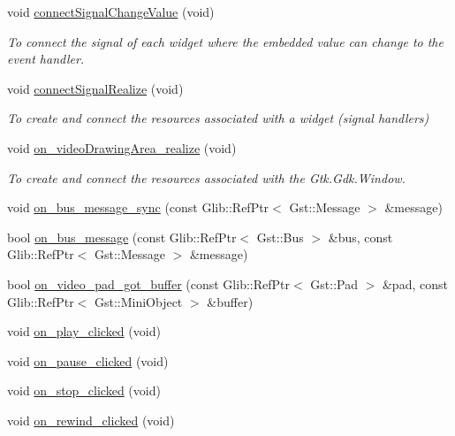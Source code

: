 \begin{DoxyCompactItemize}
void \hyperlink{classplayerWindow_a57c7d3028404d831bbecca99ecd2e6bf}{connect\-Signal\-Change\-Value} (void)
\begin{DoxyCompactList}\small\item\em To connect the signal of each widget where the embedded value can change to the event handler. \end{DoxyCompactList}\item 
void \hyperlink{classplayerWindow_a04c0d0ccc64d561bf455c45f0bf37027}{connect\-Signal\-Realize} (void)
\begin{DoxyCompactList}\small\item\em To create and connect the resources associated with a widget (signal handlers) \end{DoxyCompactList}\item 
void \hyperlink{classplayerWindow_a48b491c8e59ea9c0ef83e7579c0f8f39}{on\-\_\-video\-Drawing\-Area\-\_\-realize} (void)
\begin{DoxyCompactList}\small\item\em To create and connect the resources associated with the Gtk.\-Gdk.\-Window. \end{DoxyCompactList}\item 
void \hyperlink{classplayerWindow_adcb6e98728d16b3141b3eb5ddb8812e7}{on\-\_\-bus\-\_\-message\-\_\-sync} (const Glib\-::\-Ref\-Ptr$<$ Gst\-::\-Message $>$ \&message)
\item 
bool \hyperlink{classplayerWindow_acb2958d0b281f95d53e9887681672700}{on\-\_\-bus\-\_\-message} (const Glib\-::\-Ref\-Ptr$<$ Gst\-::\-Bus $>$ \&bus, const Glib\-::\-Ref\-Ptr$<$ Gst\-::\-Message $>$ \&message)
\item 
bool \hyperlink{classplayerWindow_ac7ad87343a718732497a5ba559f86e88}{on\-\_\-video\-\_\-pad\-\_\-got\-\_\-buffer} (const Glib\-::\-Ref\-Ptr$<$ Gst\-::\-Pad $>$ \&pad, const Glib\-::\-Ref\-Ptr$<$ Gst\-::\-Mini\-Object $>$ \&buffer)
\item 
void \hyperlink{classplayerWindow_a016e59bb4eb357d4f6955fdc50633d62}{on\-\_\-play\-\_\-clicked} (void)
\item 
void \hyperlink{classplayerWindow_ad29edd40d5997cd6d90ed5c4e8f3d6f3}{on\-\_\-pause\-\_\-clicked} (void)
\item 
void \hyperlink{classplayerWindow_aa1774c82dbf1abf26df41ea9709a7fcc}{on\-\_\-stop\-\_\-clicked} (void)
\item 
void \hyperlink{classplayerWindow_a79d2fccf5338129366ecd46b227f8f7b}{on\-\_\-rewind\-\_\-clicked} (void)
\item 

\end{DoxyCompactItemize}
